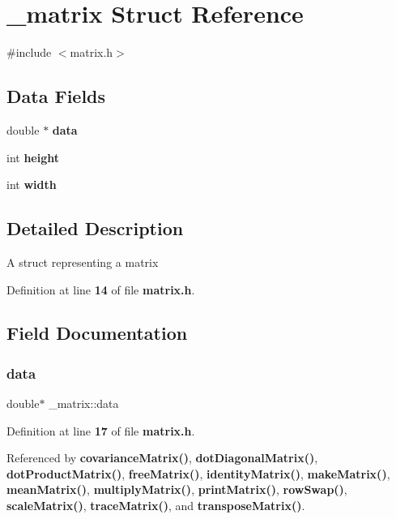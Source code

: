 \section{\+\_\+matrix Struct Reference}
\label{struct__matrix}


{\ttfamily \#include $<$matrix.\+h$>$}

\subsection*{Data Fields}
\begin{DoxyCompactItemize}
\item 
double $\ast$ \textbf{ data}
\item 
int \textbf{ height}
\item 
int \textbf{ width}
\end{DoxyCompactItemize}


\subsection{Detailed Description}
A struct representing a matrix 

Definition at line \textbf{ 14} of file \textbf{ matrix.\+h}.



\subsection{Field Documentation}
\mbox{\label{struct__matrix_ad3fdadaa9e22623d5830e37663d500be}} 
\subsubsection{data}
{\footnotesize\ttfamily double$\ast$ \+\_\+matrix\+::data}



Definition at line \textbf{ 17} of file \textbf{ matrix.\+h}.



Referenced by \textbf{ covariance\+Matrix()}, \textbf{ dot\+Diagonal\+Matrix()}, \textbf{ dot\+Product\+Matrix()}, \textbf{ free\+Matrix()}, \textbf{ identity\+Matrix()}, \textbf{ make\+Matrix()}, \textbf{ mean\+Matrix()}, \textbf{ multiply\+Matrix()}, \textbf{ print\+Matrix()}, \textbf{ row\+Swap()}, \textbf{ scale\+Matrix()}, \textbf{ trace\+Matrix()}, and \textbf{ transpose\+Matrix()}.


